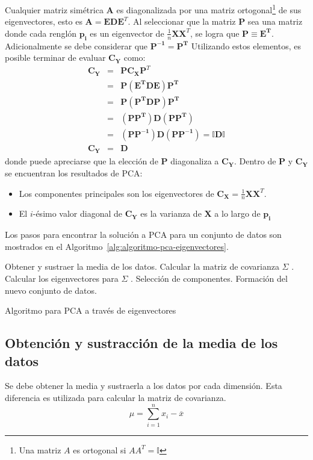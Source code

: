\documentclass{article}
\begin{document}
Cualquier matriz simétrica $\mathbf{A}$ es diagonalizada por una matriz ortogonal\footnote{Una matriz $A$ es ortogonal si $AA^T = \mathbb{I}$} de sus eigenvectores, esto es $\mathbf{A}=\mathbf{EDE}^T$.
Al seleccionar que la matriz $\mathbf{P}$ sea una matriz donde cada renglón $\mathbf{p_i}$ es un eigenvector de $\frac{1}{n}\mathbf{XX}^T$, se logra que $\mathbf{P} \equiv \mathbf{E^T}$.
Adicionalmente se debe considerar que $\mathbf{P^{-1} = P^T}$
Utilizando estos elementos, es posible terminar de evaluar $\mathbf{C_Y}$ como:
\begin{eqnarray}
\mathbf{C_Y}	&=& \mathbf{PC_XP}^T \\
				&=& \mathbf{P(E^TDE)P^T} \\
				&=& \mathbf{P(P^TDP)P^T} \\
				&=& \mathbf{(PP^T)D(PP^T)} \\
				&=& \mathbf{(PP^{-1})D(PP^{-1})} = \mathbf{\mathbb{I}D\mathbb{I}}\\
\mathbf{C_Y}	&=& \mathbf{D}
\end{eqnarray}
donde puede apreciarse que la elección de $\mathbf{P}$ diagonaliza a $\mathbf{C_Y}$.
Dentro de $\mathbf{P}$ y $\mathbf{C_Y}$ se encuentran los resultados de PCA:
\begin{itemize}
	\item Los componentes principales son los eigenvectores de $\mathbf{C_X} = \frac{1}{n}\mathbf{XX}^T$.
	\item El $i$-ésimo valor diagonal de $\mathbf{C_Y}$ es la varianza de $\mathbf{X}$ a lo largo de $\mathbf{p_i}$
\end{itemize}

Los pasos para encontrar la solución a PCA para un conjunto de datos son mostrados en el Algoritmo~\ref{alg:algoritmo-pca-eigenvectores}.

\begin{algorithm} 
\begin{algorithmic}[1] 
\STATE Obtener y sustraer la media de los datos.
\STATE Calcular la matriz de covarianza $\Sigma$ .
\STATE Calcular los eigenvectores para $\Sigma$ .
\STATE Selección de componentes.
\STATE Formación del nuevo conjunto de datos.
\end{algorithmic} 
\caption{Algoritmo para PCA a través de eigenvectores} 
\label{alg:algoritmo-pca-eigenvectores}
\end{algorithm}

\subsection{Obtención y sustracción de la media de los datos}
\label{sub:obtencion_y_sustraccion_de_la_media_de_los_datos}
Se debe obtener la media y sustraerla a los datos por cada dimensión.
Esta diferencia es utilizada para calcular la matriz de covarianza.
$$
\mu = \sum_{i=1}^n x_i - \overline{x} 
$$
\end{document}
